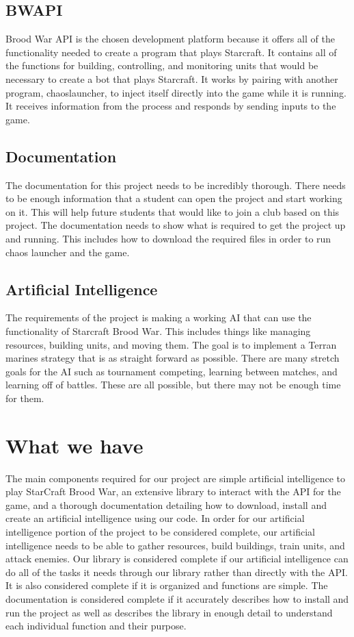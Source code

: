 \documentclass[10pt,letterpaper,onecolumn,draftclsnofoot]{IEEEtran}
\begin{document}
\subsection{BWAPI}
Brood War API is the chosen development platform because it offers all of the functionality needed to create a program that plays Starcraft. It contains all of the functions for building, controlling, and monitoring units that would be necessary to create a bot that plays Starcraft. It works by pairing with another program, chaoslauncher, to inject itself directly into the game while it is running. It receives information from the process and responds by sending inputs to the game. 

\subsection{Documentation}
The documentation for this project needs to be incredibly thorough. There needs to be enough information that a student can open the project and start working on it. This will help future students that would like to join a club based on this project. The documentation needs to show what is required to get the project up and running. This includes how to download the required files in order to run chaos launcher and the game.

\subsection{Artificial Intelligence}
The requirements of the project is making a working AI that can use the functionality of Starcraft Brood War. This includes things like managing resources, building units, and moving them. The goal is to implement a Terran marines strategy that is as straight forward as possible. There are many stretch goals for the AI such as tournament competing, learning between matches, and learning off of battles. These are all possible, but there may not be enough time for them. 

\section{What we have}
The main components required for our project are simple artificial intelligence to play StarCraft Brood War, an extensive library to interact with the API for the game, and a thorough documentation detailing how to download, install and create an artificial intelligence using our code. In order for our artificial intelligence portion of the project to be considered complete, our artificial intelligence needs to be able to gather resources, build buildings, train units, and attack enemies. Our library is considered complete if our artificial intelligence can do all of the tasks it needs through our library rather than directly with the API. It is also considered complete if it is organized and functions are simple. The documentation is considered complete if it accurately describes how to install and run the project as well as describes the library in enough detail to understand each individual function and their purpose.
\end{document}
